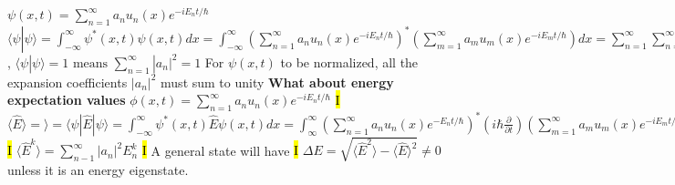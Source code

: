\documentclass[fontsize=4pt]{scrartcl}
\begin{document}
$\psi(x,t) = \sum_{n = 1}^{\infty}a_n u_n (x)e^{-iE_n t/\hbar}$
$\langle \psi | \psi \rangle = \int_{-\infty}^{\infty} \psi^{*} (x,t) \psi (x,t) dx = \int_{-\infty}^{\infty}(\sum_{n = 1}^{\infty}a_n u_n (x)e^{-iE_n t/\hbar})^{*}(\sum_{m = 1}^{\infty}a_m u_m (x)e^{-iE_m t/\hbar})dx = \sum_{n=1}^{\infty}\sum_{n=1}^{\infty}a_n^* a_m e^{-i(E_m - E_n)t/\hbar} \int_0^L u_n^*(x) u_m(x) dx = \sum_{n=1}^{\infty} |a_n|^2 $,
$\langle \psi | \psi \rangle = 1 \text{ means } \sum_{n=1}^{\infty} |a_n|^2  = 1$ 
For $\psi(x,t)$ to be normalized, all the expansion coefficients $|a_n|^2$ must sum to unity
\textbf{What about energy expectation values}
$\phi(x,t) = \sum_{n=1}^{\infty} a_n u_n (x) e^{-iE_n t/\hbar}$
\hl{I}
$\langle \hat{E} \rangle = \rangle = \langle \psi | \hat{E} | \psi \rangle = \int_{-\infty}^{\infty} \psi^*(x,t)\hat{E} \psi (x,t) dx = \int_{\infty}^{\infty} (\sum_{n=1}^{\infty} a_n u_n (x) e^{-E_n t/\hbar})^* (i\hbar \frac{\partial}{\partial t})(\sum_{m=1}^{\infty}a_m u_m (x) e^{-iE_mt/\hbar})dx = \sum_{n=1}^{\infty} \sum_{m=1}^{\infty} a_n^* a_m E_m e^{-i(E_m - E_n)t/\hbar} \int_0^L u_n^* (x)u_m (x) dx = \sum_{n=1}^{\infty}|a_n|^2 E_n$
\hl{I}
$\langle \hat{E}^{k} \rangle = \sum_{n-1}^{\infty} |a_n|^2 E_n^k$
\hl{I}
A general state will have
\hl{I}
$\Delta E = \sqrt{\langle \hat{E}^2\rangle - \langle \hat{E} \rangle^2 } \neq 0$ unless it is an energy eigenstate.
\end{document}
